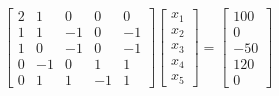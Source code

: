 \documentclass[paper.tex]{subfiles}
\begin{document}
\begin{center}
\begin{equation}
    \begin{bmatrix}
        2 & 1 & 0 & 0 & 0   \\
        1 & 1 & -1 & 0 & -1 \\
        1 & 0 & -1 & 0 & -1 \\
        0 & -1 & 0 & 1 & 1  \\
        0 & 1 & 1 & -1 & 1 
    \end{bmatrix}
    \begin{bmatrix}
        x_1 \\
        x_2 \\
        x_3 \\
        x_4 \\
        x_5
    \end{bmatrix}
    =
    \begin{bmatrix}
        100 \\
        0 \\
        -50 \\
        120 \\
        0
    \end{bmatrix}
\end{equation}
\end{center}
\end{document}
